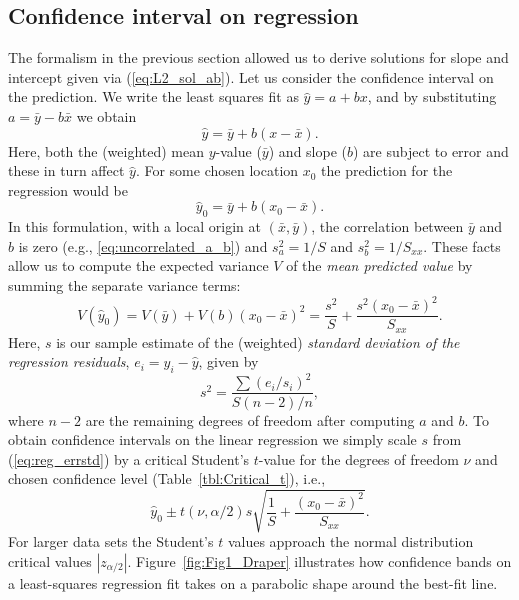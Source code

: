\subsection{Confidence interval on regression}
The formalism in the previous section allowed us to derive
solutions for slope and intercept given via (\ref{eq:L2_sol_ab}). Let us consider the confidence interval on the prediction.  We write the least squares
fit as $\hat{y} = a + bx$, and by substituting $a = \bar{y} - b\bar{x}$ we obtain
\begin{equation}
	\hat{y} = \bar{y} + b(x-\bar{x}).
\end{equation}
Here, both the (weighted) mean $y$-value ($\bar{y}$) and slope ($b$) are subject to error and these in turn affect $\hat{y}$.  For some
chosen location $x_0$ the prediction for the regression would be
\begin{equation}
	\hat{y}_0 = \bar{y} + b(x_0-\bar{x}).
\end{equation}
In this formulation, with a local origin at $(\bar{x}, \bar{y})$, the correlation between $\bar{y}$ and $b$ is zero (e.g., \ref{eq:uncorrelated_a_b})
and $s^2_a = 1/S$ and $s^2_b = 1/S_{xx}$.
These facts allow us to compute the expected variance $V$ of the \emph{mean predicted value} by summing the separate variance terms:
\begin{equation}
	V(\hat{y}_0) = V(\bar{y}) + V(b)(x_0-\bar{x})^2 = \frac{s^2}{S} + \frac{s^2(x_0 - \bar{x})^2}{S_{xx}}.
\end{equation}
Here, $s$ is our sample estimate of the (weighted) \emph{standard deviation of the regression residuals}, $e_i = y_i - \hat{y}$, given by
\begin{equation}
	s^2 = \frac{\sum (e_i/s_i)^2}{S(n-2)/n},
	\label{eq:reg_errstd}
\end{equation}
where $n-2$ are the remaining degrees of freedom after computing $a$ and $b$.
To obtain confidence intervals on the linear regression we simply scale $s$ from (\ref{eq:reg_errstd}) by a critical
Student's $t$-value for the degrees of freedom $\nu$ and chosen confidence level (Table~\ref{tbl:Critical_t}), i.e.,
\begin{equation}
	\hat{y}_0 \pm t(\nu,\alpha/2) s \sqrt{\frac{1}{S} +  \frac{(x_0 - \bar{x})^2}{S_{xx}}}.
\end{equation}
For larger data sets the Student's $t$ values approach the normal distribution critical values $|z_{\alpha/2}|$.
Figure~\ref{fig:Fig1_Draper} illustrates how confidence bands on a least-squares regression fit takes
on a parabolic shape around the best-fit line.

